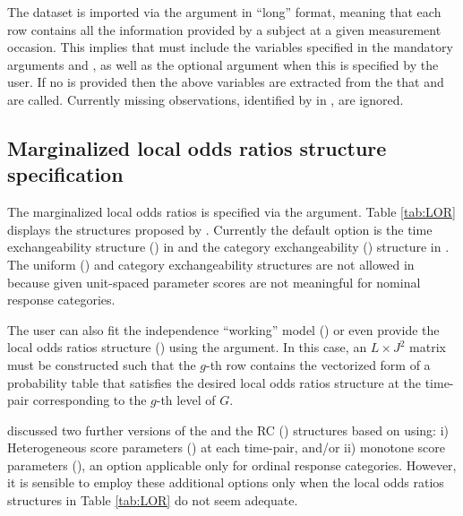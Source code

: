 \documentclass[
]{jss}
\begin{document}
The dataset is imported via the  argument in ``long'' format,
meaning that each row contains all the information provided by a subject
at a given measurement occasion. This implies that  must
include the variables specified in the mandatory arguments
 and , as well as the optional argument
 when this is specified by the user. If no  is
provided then the above variables are extracted from the
 that  and  are
called. Currently missing observations, identified by  in
, are ignored.

\hypertarget{marginalized-local-odds-ratios-structure-specification}{%
\subsection{Marginalized local odds ratios structure
specification}\label{marginalized-local-odds-ratios-structure-specification}}

The marginalized local odds ratios is specified via the 
argument. Table \ref{tab:LOR} displays the structures proposed by
\citet{Touloumis2012}. Currently the default option is the time
exchangeability structure () in  and
the category exchangeability () structure in
. The uniform () and category
exchangeability structures are not allowed in  because
given unit-spaced parameter scores are not meaningful for nominal
response categories.

The user can also fit the independence ``working'' model
() or even provide the local odds ratios
structure () using the  argument.
In this case, an \(L \times J^2\) matrix must be constructed such that
the \(g\)-th row contains the vectorized form of a probability table
that satisfies the desired local odds ratios structure at the time-pair
corresponding to the \(g\)-th level of \(G\).

\citet{Touloumis2011a} discussed two further versions of the
 and the RC () structures based on using:
i) Heterogeneous score parameters () at each
time-pair, and/or ii) monotone score parameters
(), an option applicable only for ordinal
response categories. However, it is sensible to employ these additional
options only when the local odds ratios structures in Table
\ref{tab:LOR} do not seem adequate.
\end{document}
